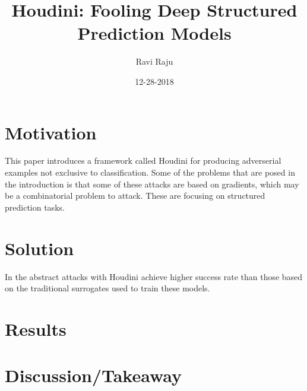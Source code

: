 \documentclass{article}
\title{Houdini: Fooling Deep Structured Prediction Models}
\date{12-28-2018}
\author{Ravi Raju}
\begin{document}
\maketitle
{}
{}
\section{Motivation}
This paper introduces a framework called Houdini for producing adverserial examples not exclusive to classification. Some of the problems that are posed in the introduction is that some of these attacks are based on gradients, which may be a combinatorial problem to attack. These are focusing on structured prediction tasks.
\section{Solution}
In the abstract attacks with Houdini achieve higher success rate than those based on the traditional surrogates used to train these models.
\section{Results}

\section{Discussion/Takeaway}
\end{document}

